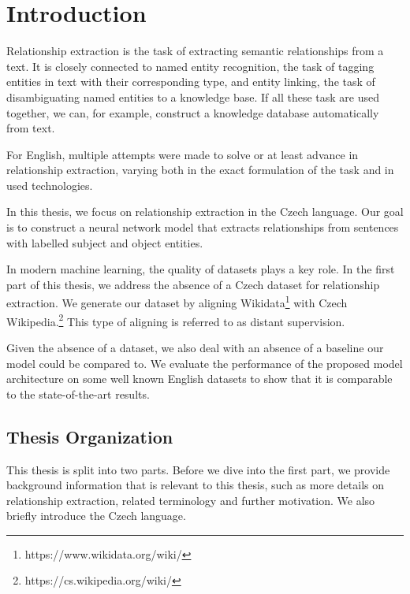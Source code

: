 \chapter*{Introduction}


Relationship extraction is the task of extracting semantic relationships from a text. It is closely connected to named entity recognition, the task of tagging entities in text with their corresponding type, and entity linking, the task of disambiguating named entities to a knowledge base. If all these task are used together, we can, for example, construct a knowledge database automatically from text. 

For English, multiple attempts were made to solve or at least advance in relationship extraction, varying both in the exact formulation of the task and in used technologies. 

In this thesis, we focus on relationship extraction in the Czech language. Our goal is to construct a neural network model that extracts relationships from sentences with labelled subject and object entities. %

In modern machine learning, the quality of datasets plays a key role. In the first part of this thesis, we address the absence of a Czech dataset for relationship extraction. We generate our dataset by aligning Wikidata\footnote{https://www.wikidata.org/wiki/} with Czech Wikipedia.\footnote{https://cs.wikipedia.org/wiki/} This type of aligning is referred to as distant supervision. %

Given the absence of a dataset, we also deal with an absence of a baseline our model could be compared to. We evaluate the performance of the proposed model architecture on some well known English datasets to show that it is comparable to the state-of-the-art results.





\section*{Thesis Organization}
This thesis is split into two parts. Before we dive into the first part, we provide background information that is relevant to this thesis, such as more details on relationship extraction, related terminology and further motivation. We also briefly introduce the Czech language.

